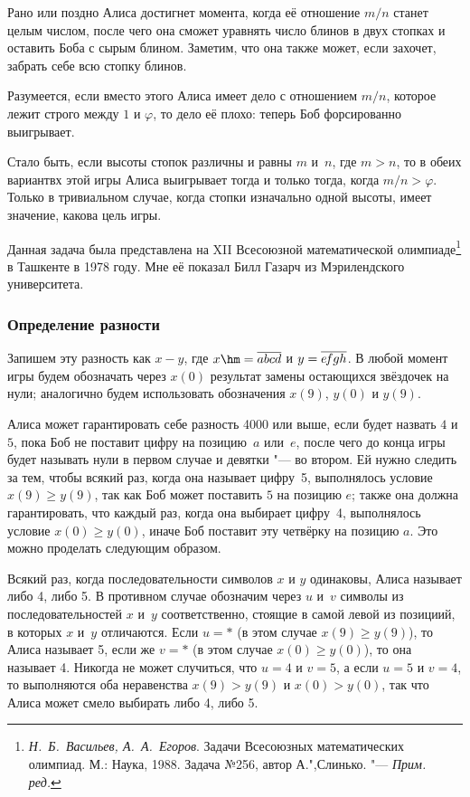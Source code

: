 \documentclass[twoside]{book}
\newcommand\VsMO{\emph{Н.~Б.~Васильев, А.~А.~Егоров}. Задачи Всесоюзных математических олимпиад. М.: Наука, 1988}
\begin{document}
Рано или поздно Алиса достигнет момента, когда её отношение $m/n$
станет целым числом, после чего она сможет уравнять число блинов в двух стопках и оставить Боба с сырым блином.
Заметим, что она также может, если захочет, забрать себе всю стопку блинов.

Разумеется, если вместо этого Алиса имеет дело с отношением $m/n$, которое лежит строго между $1$ и $\varphi$, то дело её плохо:
теперь Боб форсированно выигрывает.

Стало быть, если высоты стопок различны и равны $m$ и~$n$, где $m>n$,
то в обеих вариантвх этой игры Алиса выигрывает тогда и только тогда,
когда $m/n>\varphi$.
Только в тривиальном случае, когда стопки
изначально одной высоты, имеет значение, какова цель игры.\heart

\medskip
Данная задача была представлена на XII Всесоюзной математической олимпиаде\footnote{\VsMO. Задача №256, автор А.",Слинько. "--- \emph{Прим. ред.}} в Ташкенте в 1978 году.
Мне её показал Билл Газарч из Мэрилендского университета.%

\subsubsection*{Определение разности}%

Запишем эту разность как $x-y$, где $x\hm=\overline{abcd}$ и $y=\overline{e\mkern-2mu fgh}$.
В любой момент игры будем обозначать через $x(0)$ результат замены остающихся звёздочек на нули; аналогично будем использовать обозначения $x(9)$, $y(0)$ и $y(9)$.

Алиса может гарантировать себе разность 4000 или выше, если будет
назвать $4$ и $5$, пока Боб не поставит цифру на позицию~$a$ или~$e$,
после чего  до конца игры будет называть нули в первом случае и
девятки "--- во втором. 
Ей нужно следить за тем, чтобы всякий раз, когда она называет цифру~5, выполнялось условие $x(9)\ge y(9)$, так как Боб может поставить $5$ на позицию $e$;
также она должна гарантировать, что каждый раз, когда она выбирает цифру~4, выполнялось условие $x(0)\ge y(0)$, иначе Боб поставит эту четвёрку на позицию $a$.
Это можно проделать следующим образом.

Всякий раз, когда последовательности символов $x$ и $y$ одинаковы,
Алиса называет либо 4, либо 5.
В противном случае обозначим через $u$
и~$v$ символы из последовательностей $x$ и~$y$ соответственно, стоящие
в самой левой из позициий, в которых $x$ и~$y$ отличаются.
Если $u=*$
(в этом случае $x(9)\geqslant y(9)$), то Алиса называет 5, если же
$v=*$ (в этом случае $x(0)\geqslant y(0)$), то
она называет 4.
Никогда не может случиться, что $u=4$ и $v=5$, а если
$u=5$ и $v=4$, то выполняются оба неравенства $x(9)> y(9)$ и $x(0)>
y(0)$, так что Алиса может смело выбирать либо 4, либо 5.
\end{document}
